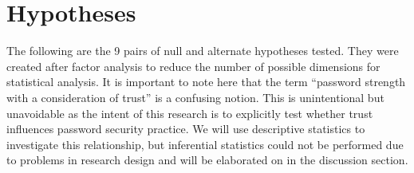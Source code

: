\documentclass[letterpaper, 10 pt, conference]{ieeeconf}  %
\begin{document}
\section{Hypotheses}

The following are the 9 pairs of null and alternate hypotheses tested. They were created after factor analysis to reduce the number of possible dimensions for statistical analysis. It is important to note here that the term “password strength with a consideration of trust” is a confusing notion. This is unintentional but unavoidable as the intent of this research is to explicitly test whether trust influences password security practice. We will use descriptive statistics to investigate this relationship, but inferential statistics could not be performed due to problems in research design and will be elaborated on in the discussion section.
\end{document}

